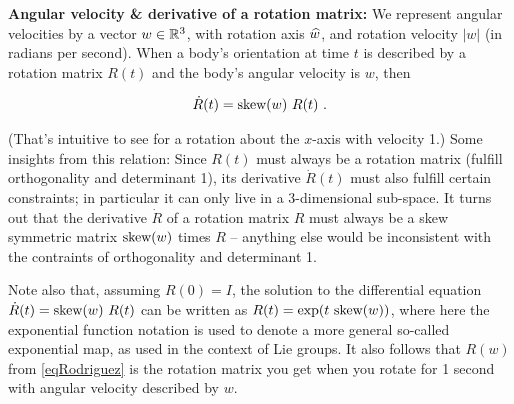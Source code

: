 \textbf{Angular velocity \& derivative of a rotation matrix:} We
represent angular velocities by a vector $w\in{\mathbb{R}}^3$, with rotation axis
$\widehat w$, and rotation velocity $|w|$ (in radians per second). When a body's orientation at time
$t$ is described by a rotation matrix $R(t)$ and the body's angular
velocity is $w$, then

\begin{align}\label{eqDotR}
\dot R(t) = \text{skew}(w)~ R(t)~.
\end{align}

(That's intuitive to see for a rotation about the $x$-axis with
velocity 1.) Some insights from this relation: Since $R(t)$ must
always be a rotation matrix (fulfill orthogonality and determinant 1),
its derivative $\dot R(t)$ must also fulfill certain constraints; in
particular it can only live in a 3-dimensional sub-space. It turns out
that the derivative $\dot R$ of a rotation matrix $R$ must always be a
skew symmetric matrix $\text{skew}(w)$ times $R$ -- anything else would be
inconsistent with the contraints of orthogonality and determinant 1.

Note also that, assuming $R(0)=I$, the solution to the differential
equation $\dot R(t) = \text{skew}(w)~ R(t)$ can be written as
$R(t)=\exp(t~ \text{skew}(w))$, where here the exponential function notation
is used to denote a more general so-called exponential map, as used in
the context of Lie groups. It also follows that $R(w)$ from
\eqref{eqRodriguez} is the rotation matrix you get when you rotate for
1 second with angular velocity described by $w$.


